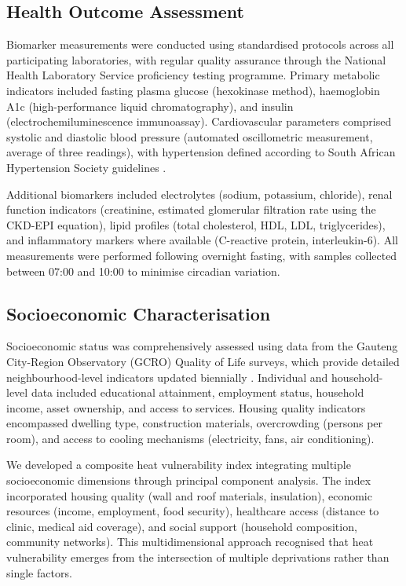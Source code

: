 \documentclass[11pt,a4paper]{article}
\begin{document}
\subsection{Health Outcome Assessment}

Biomarker measurements were conducted using standardised protocols across all participating laboratories, with regular quality assurance through the National Health Laboratory Service proficiency testing programme. Primary metabolic indicators included fasting plasma glucose (hexokinase method), haemoglobin A1c (high-performance liquid chromatography), and insulin (electrochemiluminescence immunoassay). Cardiovascular parameters comprised systolic and diastolic blood pressure (automated oscillometric measurement, average of three readings), with hypertension defined according to South African Hypertension Society guidelines \citep{Seedat2014}.

Additional biomarkers included electrolytes (sodium, potassium, chloride), renal function indicators (creatinine, estimated glomerular filtration rate using the CKD-EPI equation), lipid profiles (total cholesterol, HDL, LDL, triglycerides), and inflammatory markers where available (C-reactive protein, interleukin-6). All measurements were performed following overnight fasting, with samples collected between 07:00 and 10:00 to minimise circadian variation.

\subsection{Socioeconomic Characterisation}

Socioeconomic status was comprehensively assessed using data from the Gauteng City-Region Observatory (GCRO) Quality of Life surveys, which provide detailed neighbourhood-level indicators updated biennially \citep{DeKadt2021}. Individual and household-level data included educational attainment, employment status, household income, asset ownership, and access to services. Housing quality indicators encompassed dwelling type, construction materials, overcrowding (persons per room), and access to cooling mechanisms (electricity, fans, air conditioning).

We developed a composite heat vulnerability index integrating multiple socioeconomic dimensions through principal component analysis. The index incorporated housing quality (wall and roof materials, insulation), economic resources (income, employment, food security), healthcare access (distance to clinic, medical aid coverage), and social support (household composition, community networks). This multidimensional approach recognised that heat vulnerability emerges from the intersection of multiple deprivations rather than single factors.
\end{document}
